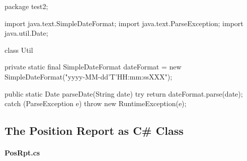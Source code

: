 \documentclass[submission]{eptcs}
\begin{document}
\begin{javacode}
package test2;

import java.text.SimpleDateFormat;
import java.text.ParseException;
import java.util.Date;

class Util {
    private static final SimpleDateFormat dateFormat
        = new SimpleDateFormat("yyyy-MM-dd'T'HH:mm:ssXXX");

    public static Date parseDate(String date) {
        try {
            return dateFormat.parse(date);
        } catch (ParseException e) {
            throw new RuntimeException(e);
        }
    }
}
\end{javacode}


\subsection{The Position Report as C\# Class}
\label{sec:posrpt:csharp}

\paragraph{PosRpt.cs}
\end{document}
